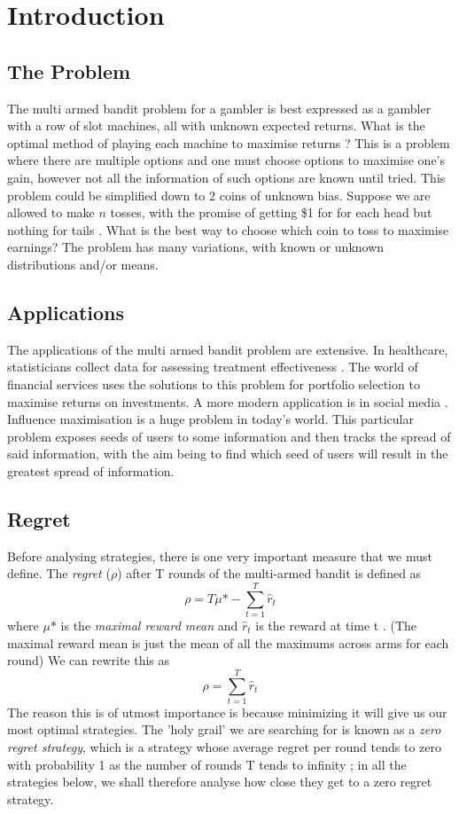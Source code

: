 \section{Introduction}
\subsection{The Problem}
The multi armed bandit problem for a gambler is best expressed as a gambler with a row of slot machines, all with unknown expected returns. What is the optimal method of playing each machine to maximise returns \citep{vermorel}? This is a problem where there are multiple options and one must choose options to maximise one's gain, however not all the information of such options are known until tried.
\newline
\newline
This problem could be simplified down to 2 coins of unknown bias. Suppose we are allowed to make $n$ tosses, with the promise of getting \$1 for for each head but nothing for tails \citep{robbins1952some}. What is the best way to choose which coin to toss to maximise earnings? The problem has many variations, with known or unknown distributions and/or means.

\subsection{Applications}
The applications of the multi armed bandit problem are extensive. In healthcare, statisticians collect data for assessing treatment effectiveness \citep{bouneffouf2019survey}. The world of financial services uses the solutions to this problem for portfolio selection to maximise returns on investments.
\newline
\newline
A more modern application is in social media \citep{chen2013combinatorial}. Influence maximisation is a huge problem in today's world. This particular problem exposes seeds of users to some information and then tracks the spread of said information, with the aim being to find which seed of users will result in the greatest spread of information.

\subsection{Regret}
Before analysing strategies, there is one very important measure that we must define. The \emph{regret} ($\rho$) after T rounds of the multi-armed bandit is defined as $$\rho = T\mu\mbox{*} - \sum_{t=1}^T\hat{r}_t$$ where $\mu\mbox{*}$ is the \emph{maximal reward mean} and $\hat{r}_t$ is the reward at time t \citep{vermorel}. (The maximal reward mean is just the mean of all the maximums across arms for each round) We can rewrite this as $$\rho = \sum_{t=1}^T\hat{r}_t$$ The reason this is of utmost importance is because minimizing it will give us our most optimal strategies. The 'holy grail' we are searching for is known as a \emph{zero regret strategy}, which is a strategy whose average regret per round tends to zero with probability 1 as the number of rounds T tends to infinity \citep{vermorel}; in all the strategies below, we shall therefore analyse how close they get to a zero regret strategy.